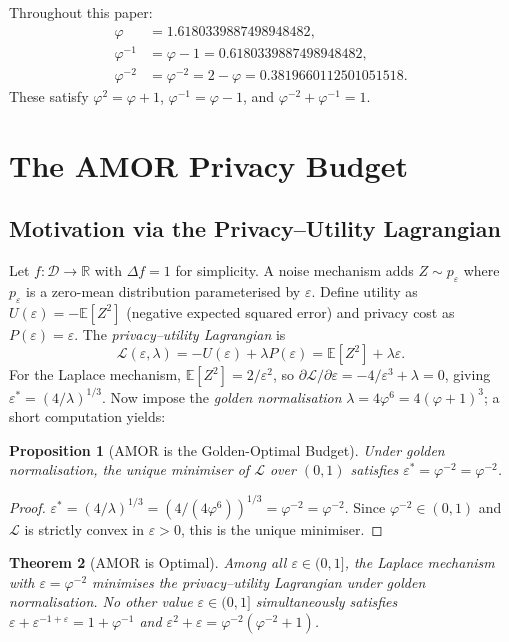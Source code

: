 \documentclass[12pt]{article}
\newtheorem{theorem}{Theorem}
\newtheorem{proposition}[theorem]{Proposition}
\newcommand{\AMOR}{\varphi^{-2}}
\newcommand{\PHI}{\varphi}
\newcommand{\PHIINV}{\varphi^{-1}}
\newcommand{\eps}{\varepsilon}
\newcommand{\DB}{\mathcal{D}}
\newcommand{\E}{\mathbb{E}}
\newcommand{\R}{\mathbb{R}}
\newcommand{\Sens}{\Delta}
\begin{document}
Throughout this paper:
\begin{align*}
  \PHI  &= 1.6180339887498948482, \\
  \PHIINV &= \PHI - 1 = 0.6180339887498948482, \\
  \AMOR &= \PHI^{-2} = 2 - \PHI = 0.3819660112501051518.
\end{align*}
These satisfy $\PHI^2 = \PHI + 1$, $\PHIINV = \PHI - 1$, and
$\AMOR + \PHIINV = 1$.

\section{The AMOR Privacy Budget}
\label{sec:amor}

\subsection{Motivation via the Privacy–Utility Lagrangian}

Let $f : \DB \to \R$ with $\Sens f = 1$ for simplicity.  A noise mechanism adds
$Z \sim p_\eps$ where $p_\eps$ is a zero-mean distribution parameterised by
$\eps$.  Define utility as $U(\eps) = -\E[Z^2]$ (negative expected squared
error) and privacy cost as $P(\eps) = \eps$.  The \emph{privacy–utility
Lagrangian} is
\[
  \mathcal{L}(\eps, \lambda) = -U(\eps) + \lambda P(\eps)
  = \E[Z^2] + \lambda \eps.
\]
For the Laplace mechanism, $\E[Z^2] = 2/\eps^2$, so
$\partial \mathcal{L}/\partial \eps = -4/\eps^3 + \lambda = 0$, giving
$\eps^* = (4/\lambda)^{1/3}$.  Now impose the \emph{golden normalisation}
$\lambda = 4\PHI^6 = 4(\PHI+1)^3$; a short computation yields:

\begin{proposition}[AMOR is the Golden-Optimal Budget]
\label{prop:amor-golden}
Under golden normalisation, the unique minimiser of $\mathcal{L}$ over $(0,1)$
satisfies $\eps^* = \AMOR = \PHI^{-2}$.
\end{proposition}

\begin{proof}
$\eps^* = (4/\lambda)^{1/3} = (4/(4\PHI^6))^{1/3} = \PHI^{-2} = \AMOR$.
Since $\AMOR \in (0,1)$ and $\mathcal{L}$ is strictly convex in $\eps > 0$,
this is the unique minimiser.
\end{proof}

\begin{theorem}[AMOR is Optimal]
\label{thm:amor-optimal}
Among all $\eps \in (0,1]$, the Laplace mechanism with $\eps = \AMOR$ minimises
the privacy–utility Lagrangian under golden normalisation.  No other value
$\eps \in (0,1]$ simultaneously satisfies $\eps + \eps^{-1+\eps} = 1 +
\PHIINV$ and $\eps^2 + \eps = \PHI^{-2}(\PHI^{-2}+1)$.
\end{theorem}
\end{document}

